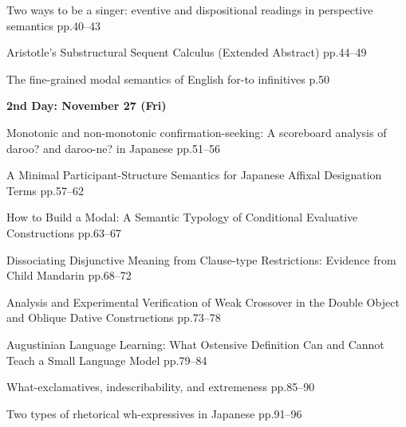 \documentclass[12pt]{ltjarticle}
\begin{document}
     {Two ways to be a singer: eventive and dispositional readings in perspective semantics}
     {pp.40--43}
  
     {Aristotle's Substructural Sequent Calculus (Extended Abstract)}
     {pp.44--49}




  
     {The fine-grained modal semantics of English for-to infinitives}
     {p.50}




\noindent\textbf{\large 
2nd Day: November 27 (Fri)
}\\




  
     {Monotonic and non-monotonic confirmation-seeking: A scoreboard analysis of daroo? and daroo-ne? in Japanese}
     {pp.51--56}
  
     {A Minimal Participant-Structure Semantics for Japanese Affixal Designation Terms}
     {pp.57--62}
  
     {How to Build a Modal: A Semantic Typology of Conditional Evaluative Constructions}
     {pp.63--67}




  
     {Dissociating Disjunctive Meaning from Clause-type Restrictions: Evidence from Child Mandarin}
     {pp.68--72}
  
     {Analysis and Experimental Verification of Weak Crossover in the Double Object and Oblique Dative Constructions}
     {pp.73--78}
  
     {Augustinian Language Learning: What Ostensive Definition Can and Cannot Teach a Small Language Model}
     {pp.79--84}




  
     {What-exclamatives, indescribability, and extremeness}
     {pp.85--90}
  
     {Two types of rhetorical wh-expressives in Japanese}
     {pp.91--96}
  
\end{document}
